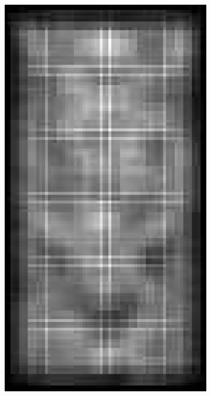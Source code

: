 \documentclass[thesis.tex]{subfiles}
\begin{document}
\begin{figure}[tb]
{\begin{subfigure}[t]{0.17\textwidth}
		\vspace{2mm}
	\end{subfigure}
	\begin{subfigure}[t]{0.17\textwidth}
		\includegraphics[width=\textwidth]{img/inriaExampleDescriptorSvmMin.pdf}
		\caption{}
		\label{fig:inriaExampleDescriptorSvmMin}
		\vspace{2mm}

\end{subfigure}}
\end{figure}
\end{document}
